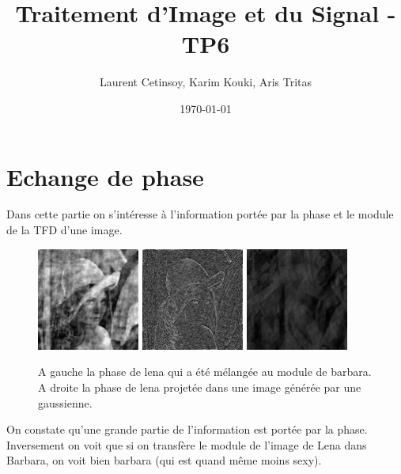 \documentclass{article}
\title{Traitement d'Image et du Signal - TP6}
\author{Laurent Cetinsoy, Karim Kouki, Aris Tritas }
\date{\today}
\begin{document}
\maketitle

\section{Echange de phase}

Dans cette partie on s'intéresse à l'information portée par la phase et le module de la TFD d'une image. 


\begin{figure}[h]
	\includegraphics[width=0.3\textwidth]{phase_swapping.jpg}
	\includegraphics[width=0.3\textwidth]{phase_swapping_in_random.jpg}
	\includegraphics[width=0.3\textwidth]{module_swapping.jpg}

  \caption{A gauche la phase de lena qui a été mélangée au module de barbara. A droite la phase de lena projetée dans une image générée par une gaussienne.}
\end{figure}

On constate qu'une grande partie de l'information est portée par la phase. Inversement on voit que si on transfère le module de l'image de Lena dans Barbara, on voit bien barbara (qui est quand même moins sexy). 
\end{document}
